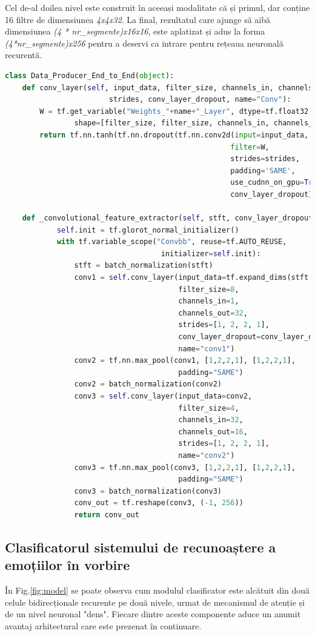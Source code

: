 \documentclass[a4paper,12pt]{book}
\begin{document}
				Cel de-al doilea nivel este construit în aceeași modalitate că și primul, dar conține 16 filtre de dimensiunea \textit{4x4x32}. La final, rezultatul care ajunge să aibă dimensiunea \textit{(4 * nr\_segmente)x16x16}, este aplatizat și adus la forma \textit{(4*nr\_segmente)x256} pentru a deservi ca intrare pentru rețeaua neuronală recurentă. 
				\begin{lstlisting}[language=Python, caption={Implementarea nivelelor convoluționale care realizează extragerea caracteristicilor în manieră end-to-end folosind procedurile librăriei Tensorflow.}, xleftmargin=-1cm, label=cnn_code]
class Data_Producer_End_to_End(object):
	def conv_layer(self, input_data, filter_size, channels_in, channels_out, 
						strides, conv_layer_dropout, name="Conv"):
		W = tf.get_variable("Weights_"+name+"_Layer", dtype=tf.float32, 
				shape=[filter_size, filter_size, channels_in, channels_out])
		return tf.nn.tanh(tf.nn.dropout(tf.nn.conv2d(input=input_data, 
													filter=W, 
													strides=strides, 
													padding='SAME', 
													use_cudnn_on_gpu=True), 
													conv_layer_dropout))
					
	def _convolutional_feature_extractor(self, stft, conv_layer_dropout):
			self.init = tf.glorot_normal_initializer()
			with tf.variable_scope("Convbb", reuse=tf.AUTO_REUSE, 
									initializer=self.init):
				stft = batch_normalization(stft)
				conv1 = self.conv_layer(input_data=tf.expand_dims(stft,axis=3),
										filter_size=8, 
										channels_in=1, 
										channels_out=32, 
										strides=[1, 2, 2, 1], 
										conv_layer_dropout=conv_layer_dropout, 
										name="conv1")			
				conv2 = tf.nn.max_pool(conv1, [1,2,2,1], [1,2,2,1], 
										padding="SAME")
				conv2 = batch_normalization(conv2)
				conv3 = self.conv_layer(input_data=conv2, 
										filter_size=4, 
										channels_in=32,
										channels_out=16, 
										strides=[1, 2, 2, 1], 										conv_layer_dropout=conv_layer_dropout, 
										name="conv2")				
				conv3 = tf.nn.max_pool(conv3, [1,2,2,1], [1,2,2,1], 
										padding="SAME")
				conv3 = batch_normalization(conv3)
				conv_out = tf.reshape(conv3, (-1, 256))
				return conv_out	\end{lstlisting}		
			
			\subsection{Clasificatorul sistemului de recunoaștere a emoțiilor în vorbire} \label{clasif_prac}
				În Fig.\ref{fig:model} se poate observa cum modulul clasificator este alcătuit din două celule bidirecționale recurente pe două nivele, urmat de mecanismul de atenție și de un nivel neuronal "dens". Fiecare dintre aceste componente aduce un anumit avantaj arhitectural care este prezenat în continuare. \par 
				
\end{document}
